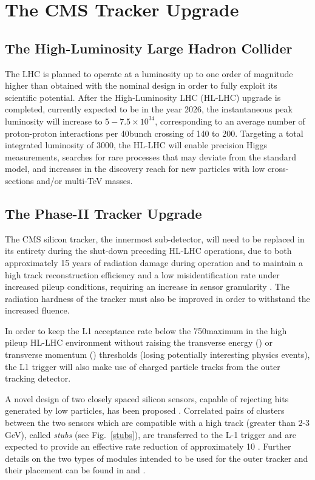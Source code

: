 \section{The CMS Tracker Upgrade}\label{sec:tk-upgrade}
 
\subsection{The High-Luminosity Large Hadron Collider} 
The LHC is planned to operate at a luminosity up to one order of magnitude higher than obtained with the nominal design in order to fully exploit its scientific potential.
After the High-Luminosity LHC (HL-LHC) upgrade \cite{hl-lhc-prelim-design-report} is completed, currently expected to be in the year 2026, the instantaneous peak luminosity will increase to $5-7.5 \times {10}^{34}$\percms, corresponding to an average number of proton-proton interactions per 40\MHz bunch crossing of 140 to 200.
Targeting a total integrated luminosity of $3000$\fbinv, the HL-LHC will enable precision Higgs measurements, searches for rare processes that may deviate from the standard model, and increases in the discovery reach for new particles with low cross-sections and/or multi-TeV masses.


\subsection{The Phase-II Tracker Upgrade}

The CMS silicon tracker, the innermost sub-detector, will need to be replaced in its entirety during the shut-down preceding HL-LHC operations, due to both approximately 15 years of radiation damage during operation and to maintain a high track reconstruction efficiency and a low misidentification rate under increased pileup conditions, requiring an increase in sensor granularity \cite{P2TrackerTDR}. The radiation hardness of the tracker must also be improved in order to withstand the increased fluence.

In order to keep the L1 acceptance rate below the 750\kHz maximum in the high pileup HL-LHC environment without raising the transverse energy (\ET) or transverse momentum (\pT) thresholds (losing potentially interesting physics events), the L1 trigger will also make use of charged particle tracks from the outer tracking detector.
 
A novel design of two closely spaced silicon sensors, capable of rejecting hits generated by low \pT particles, has been proposed \cite{jjonespixel,markthesis}. Correlated pairs of clusters between the two sensors which are compatible with a high \pT track (greater than 2-3 GeV), called \textit{stubs} (see Fig.~\ref{stubs}), are transferred to the L-1 trigger and are expected to provide an effective rate reduction of approximately 10 \cite{mpessimperf,2dptmoduleconcept}. Further details on the two types of \pT modules intended to be used for the outer tracker and their placement can be found in \cite{CMS_Upgrade_TP} and \cite{P2TrackerTDR}.


